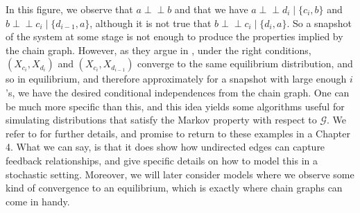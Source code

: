 \documentclass[11pt, a4paper]{memoir}
\theoremstyle{break}
\theoremstyle{break}
\theoremstyle{nonumberplain}
\newcommand{\indep}{\perp \!\!\! \perp}
\begin{document}
In this figure, we observe that $a\indep b$ and that we have $a\indep d_i\mid \{c_i,b\}$ and $b\indep c_i\mid\{d_{i-1},a\}$, although it is not true that $b\indep c_i\mid\{d_i,a\}$. So a snapshot of the system at some stage is not enough to produce the properties implied by the chain graph. However, as they argue in \cite{ChainGraph}, under the right conditions, $(X_{c_i},X_{d_i})$ and $(X_{c_i},X_{d_{i-1}})$ converge to the same equilibrium distribution, and so in equilibrium, and therefore approximately for a snapshot with large enough $i$'s, we have the desired conditional independences from the chain graph. One can be much more specific than this, and this idea yields some algorithms useful for simulating distributions that satisfy the Markov property with respect to $\mathcal{G}$. We refer to \cite{ChainGraph} for further details, and promise to return to these examples in a Chapter 4. What we can say, is that it does show how undirected edges can capture feedback relationships, and give specific details on how to model this in a stochastic setting. Moreover, we will later consider models where we observe some kind of convergence to an equilibrium, which is exactly where chain graphs can come in handy.
\end{document}
